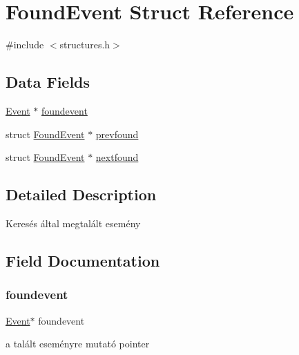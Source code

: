 \hypertarget{struct_found_event}{}\section{Found\+Event Struct Reference}
\label{struct_found_event}


{\ttfamily \#include $<$structures.\+h$>$}

\subsection*{Data Fields}
\begin{DoxyCompactItemize}
\item 
\hyperlink{struct_event}{Event} $\ast$ \hyperlink{struct_found_event_a9fb10dd8687d775ac50c8824bde19d67}{foundevent}
\item 
struct \hyperlink{struct_found_event}{Found\+Event} $\ast$ \hyperlink{struct_found_event_add29159b298db5eb8c68bd9314e7c498}{prevfound}
\item 
struct \hyperlink{struct_found_event}{Found\+Event} $\ast$ \hyperlink{struct_found_event_acbce65ffd090e8c5d45aa15b2ccdf453}{nextfound}
\end{DoxyCompactItemize}


\subsection{Detailed Description}
Keresés által megtalált esemény 

\subsection{Field Documentation}
\mbox{\label{struct_found_event_a9fb10dd8687d775ac50c8824bde19d67}} 
\subsubsection{\texorpdfstring{foundevent}{foundevent}}
{\footnotesize\ttfamily \hyperlink{struct_event}{Event}$\ast$ foundevent}

a talált eseményre mutató pointer \mbox{\label{struct_found_event_acbce65ffd090e8c5d45aa15b2ccdf453}} 
